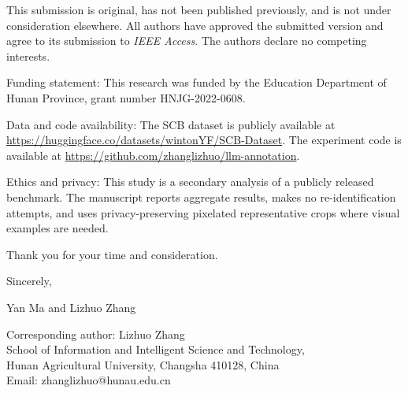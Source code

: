 \documentclass[11pt]{article}
\begin{document}
This submission is original, has not been published previously, and is not under
consideration elsewhere. All authors have approved the submitted version and
agree to its submission to \textit{IEEE Access}. The authors declare no
competing interests.

Funding statement: This research was funded by the Education Department of
Hunan Province, grant number HNJG-2022-0608.

Data and code availability: The SCB dataset is publicly available at
\url{https://huggingface.co/datasets/wintonYF/SCB-Dataset}. The experiment code
is available at \url{https://github.com/zhanglizhuo/llm-annotation}.

Ethics and privacy: This study is a secondary analysis of a publicly released
benchmark. The manuscript reports aggregate results, makes no re-identification
attempts, and uses privacy-preserving pixelated representative crops where
visual examples are needed.

Thank you for your time and consideration.

Sincerely,

Yan Ma and Lizhuo Zhang

Corresponding author:
Lizhuo Zhang \\
School of Information and Intelligent Science and Technology, \\
Hunan Agricultural University, Changsha 410128, China \\
Email: zhanglizhuo@hunau.edu.cn
\end{document}
